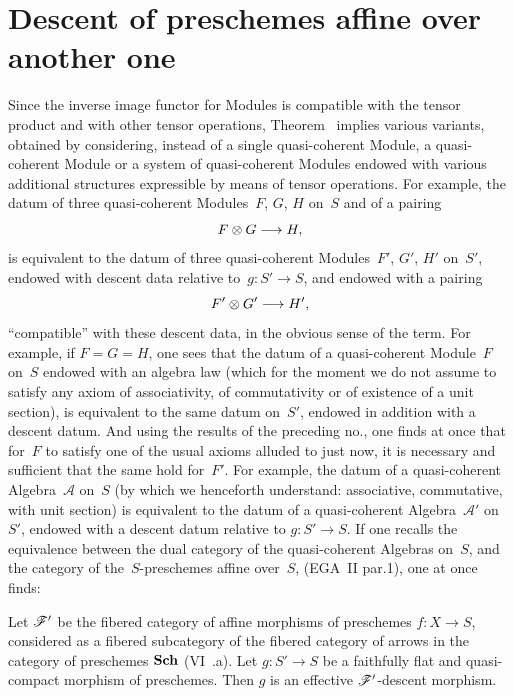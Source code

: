 \section{Descent of preschemes affine over another one}
\label{VIII.2}

Since the inverse image functor for Modules is compatible with the
tensor product and with other tensor operations,
Theorem~ implies various variants, obtained by
considering, instead of a single quasi-coherent Module, a
quasi-coherent Module or a system of quasi-coherent Modules endowed
with various additional structures expressible by means of tensor
operations. For example, the datum of three quasi-coherent
Modules~$F$, $G$, $H$ on~$S$ and of a pairing
$$
F\otimes G\to H\quoi,
$$
is equivalent to the datum of three quasi-coherent Modules~$F'$,
$G'$, $H'$ on~$S'$, endowed with descent data relative
to~$g\colon S'\to S$, and endowed with a pairing
$$
F'\otimes G'\to H'\quoi,
$$
``compatible'' with these descent data, in the obvious sense of the
term. For example, if $F=G=H$, one sees that the datum of a
quasi-coherent Module~$F$ on~$S$ endowed with an algebra law (which
for the moment we do not assume to satisfy any axiom of
associativity, of commutativity or of existence of a unit section),
is equivalent to the same datum on~$S'$, endowed in addition with a
descent datum. And using the results of the preceding no., one
finds at once that for~$F$ to satisfy one of the usual axioms
alluded to just now, it is necessary and sufficient that the same
hold for~$F'$. For example, the datum of a quasi-coherent
Algebra~$\mathcal{A}$ on~$S$ (by which we henceforth understand:
associative, commutative, with unit section) is equivalent to the
datum of a quasi-coherent Algebra~$\mathcal{A}'$ on~$S'$, endowed
with a descent datum relative to
$g\colon S'\to S$.
If one recalls the equivalence between the dual category of the
quasi-coherent Algebras on~$S$, and the category of
the~$S$-preschemes affine over~$S$, (EGA~II par.1), one at once
finds:

\begin{theorem}
\label{VIII.2.1}
Let $\cal{F}'$ be the fibered category of affine morphisms of
preschemes $f\colon X\to S$, considered as a fibered subcategory of
the fibered category
of arrows in the category of preschemes $\mathbf{Sch}$
\textup{(VI~.a)}. Let $g\colon S'\to S$ be a faithfully
flat and quasi-compact morphism of preschemes. Then $g$ is an
effective $\cal{F}'$-descent morphism.
\end{theorem}

